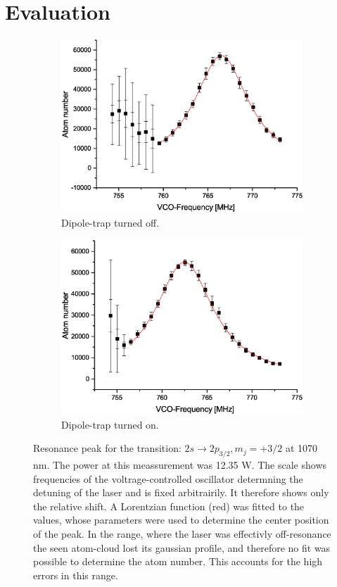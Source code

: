 \section{Evaluation}
\begin{figure}[H]
\centering
\begin{subfigure}[b]{0.48\textwidth}
                \includegraphics[width=\textwidth]{withoutodt}
                \caption{Dipole-trap turned off.}
\end{subfigure}
\begin{subfigure}[b]{0.48\textwidth}
               \includegraphics[width=\textwidth]{withodt}
                \caption{Dipole-trap turned on.}
\end{subfigure}


\caption{Resonance peak for the transition: $2s\rightarrow2p_{3/2}, m_j=+3/2$ at 1070 nm. The power at this meassurement was 12.35 W. The scale shows frequencies of the voltrage-controlled oscillator determning the detuning of the laser and is fixed arbitrairily. It therefore shows only the relative shift. A Lorentzian function (red) was fitted to the values, whose parameters were used to determine the center position of the peak. In the range, where the laser was effectivly off-resonance the seen atom-cloud lost its gaussian profile, and therefore no fit was possible to determine the atom number. This accounts for the high errors in this range.}
\label{resonance}
\end{figure}

